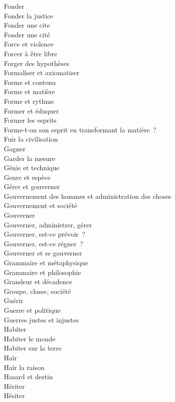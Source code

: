 \documentclass[a4paper,12pt]{article}
\begin{document}
Fonder \\
Fonder la justice \\
Fonder une cite \\
Fonder une cité \\
Force et violence \\
Forcer à être libre \\
Forger des hypothèses \\
Formaliser et axiomatiser \\
Forme et contenu \\
Forme et matière \\
Forme et rythme \\
Former et éduquer \\
Former les esprits \\
Forme-t-on son esprit en transformant la matière ? \\
Fuir la civilisation \\
Gagner \\
Garder la mesure \\
Génie et technique \\
Genre et espèce \\
Gérer et gouverner \\
Gouvernement des hommes et administration des choses \\
Gouvernement et société \\
Gouverner \\
Gouverner, administrer, gérer \\
Gouverner, est-ce prévoir ? \\
Gouverner, est-ce régner ? \\
Gouverner et se gouverner \\
Grammaire et métaphysique \\
Grammaire et philosophie \\
Grandeur et décadence \\
Groupe, classe, société \\
Guérir \\
Guerre et politique \\
Guerres justes et injustes \\
Habiter \\
Habiter le monde \\
Habiter sur la terre \\
Haïr \\
Haïr la raison \\
Hasard et destin \\
Hériter \\
Hésiter \\
\end{document}
